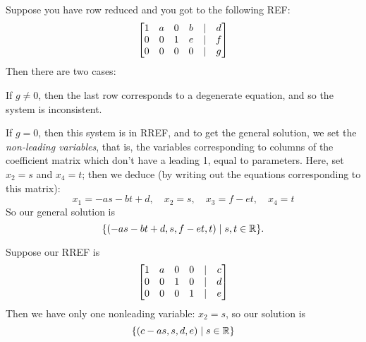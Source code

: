 \begin{myexample} \label{ex:inconsis} Suppose you have row reduced and you got to the following
REF:
$$
\left[ \begin{matrix} 1 & a & 0 & b & | & d\\
0 & 0 & 1 & e &|& f\\
0 & 0 & 0 & 0 &|& g
 \end{matrix} \right]
$$
Then there are two cases:  

If $g \neq 0$, then the last
row corresponds to a degenerate equation, and so the system
is inconsistent.

If $g = 0$, then this system is in RREF, and to get the general
solution, we set the \emph{non-leading variables}, that is, 
the variables corresponding to columns of the coefficient
matrix which don't have a leading 1, equal to parameters.
Here, set $x_2 = s$ and $x_4 = t$; then we deduce (by writing
out the equations corresponding to this matrix):
$$
x_1 = -as-bt+d, \quad x_2 = s, \quad x_3 = f-et, \quad x_4 = t
$$
So our general solution is
$$
\{ ( -as-bt+d, s, f-et, t) \mid s,t\in\mathbb{R}\}.
$$
\end{myexample}


\begin{myexample} \label{ex:infsol} Suppose our RREF is
$$
\left[ \begin{matrix} 1 & a & 0 & 0 & | & c\\
0 & 0 & 1 & 0 & | & d\\
0 & 0 & 0 & 1 & | & e \end{matrix} \right]
$$
Then we have only one nonleading variable: $x_2 = s$, so our
solution is
$$
\{ (c-as, s, d,e) \mid s\in\mathbb{R}\}
$$
\end{myexample}


